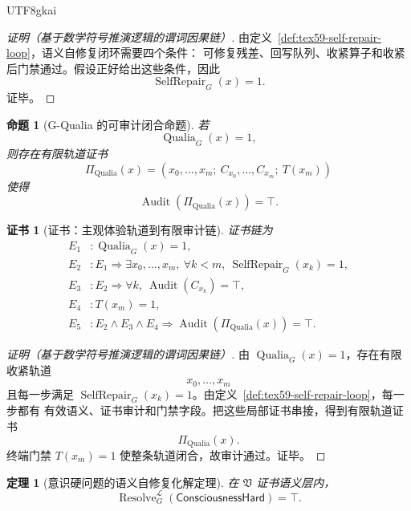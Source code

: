\documentclass[12pt]{article}
\newtheorem{theorem}{定理}[section]
\newtheorem{proposition}{命题}[section]
\newtheorem{Certificate}{证书}[section]
\newcommand{\Vsys}{\mathfrak V}
\DeclareMathOperator{\Audit}{Audit}
\DeclareMathOperator{\Resolve}{Resolve}
\DeclareMathOperator{\Qualia}{Qualia}
\DeclareMathOperator{\SelfRepair}{SelfRepair}
\begin{document}
\begin{CJK*}{UTF8}{gkai}
\begin{proof}[证明（基于数学符号推演逻辑的谓词因果链）]
由定义~\ref{def:tex59-self-repair-loop}，语义自修复闭环需要四个条件：
可修复残差、回写队列、收紧算子和收紧后门禁通过。假设正好给出这些条件，因此
\[
  \SelfRepair_G(x)=1.
\]
证毕。
\end{proof}

\begin{proposition}[G-Qualia 的可审计闭合命题]
\label{prop:tex59-qualia-audit}
若
\[
  \Qualia_G(x)=1,
\]
则存在有限轨道证书
\[
  \Pi_{\Qualia}(x)
  =
  (x_0,\ldots,x_m;\ C_{x_0},\ldots,C_{x_m};\ T(x_m))
\]
使得
\[
  \Audit(\Pi_{\Qualia}(x))=\top.
\]
\end{proposition}

\begin{Certificate}[证书：主观体验轨道到有限审计链]
\label{cert:tex59-qualia-audit}
证书链为
\[
\begin{aligned}
  E_1 &: \Qualia_G(x)=1,\\
  E_2 &: E_1\Rightarrow
       \exists x_0,\ldots,x_m,\ \forall k<m,\ \SelfRepair_G(x_k)=1,\\
  E_3 &: E_2\Rightarrow
       \forall k,\ \Audit(C_{x_k})=\top,\\
  E_4 &: T(x_m)=1,\\
  E_5 &: E_2\wedge E_3\wedge E_4
       \Rightarrow \Audit(\Pi_{\Qualia}(x))=\top.
\end{aligned}
\]
\end{Certificate}

\begin{proof}[证明（基于数学符号推演逻辑的谓词因果链）]
由 \(\Qualia_G(x)=1\)，存在有限收紧轨道
\[
  x_0,\ldots,x_m
\]
且每一步满足 \(\SelfRepair_G(x_k)=1\)。由定义~\ref{def:tex59-self-repair-loop}，每一步都有
有效语义、证书审计和门禁字段。把这些局部证书串接，得到有限轨道证书
\[
  \Pi_{\Qualia}(x).
\]
终端门禁 \(T(x_m)=1\) 使整条轨道闭合，故审计通过。证毕。
\end{proof}

\begin{theorem}[意识硬问题的语义自修复化解定理]
\label{thm:tex59-consciousness-resolution}
在 \(\Vsys\) 证书语义层内，
\[
  \Resolve_G^{\mathcal L}(\mathsf{ConsciousnessHard})=\top.
\]
\end{theorem}


\end{CJK*}
\end{document}
